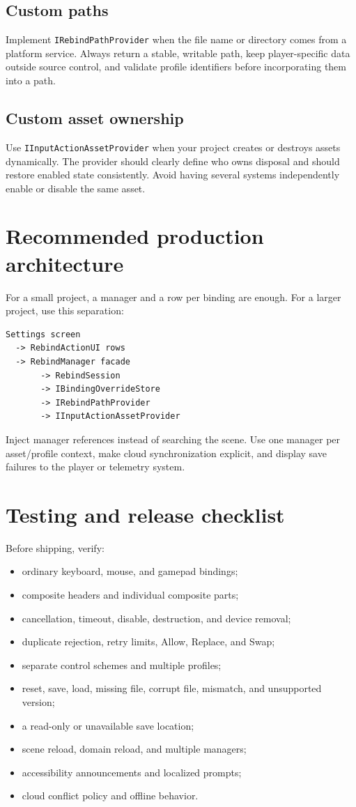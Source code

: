 \documentclass[11pt,a4paper]{article}
\newcommand{\class}[1]{\texttt{#1}}
\begin{document}
\subsection{Custom paths}
Implement \class{IRebindPathProvider} when the file name or directory comes from a platform service. Always return a stable, writable path, keep player-specific data outside source control, and validate profile identifiers before incorporating them into a path.

\subsection{Custom asset ownership}
Use \class{IInputActionAssetProvider} when your project creates or destroys assets dynamically. The provider should clearly define who owns disposal and should restore enabled state consistently. Avoid having several systems independently enable or disable the same asset.

\section{Recommended production architecture}
For a small project, a manager and a row per binding are enough. For a larger project, use this separation:
\begin{verbatim}
Settings screen
  -> RebindActionUI rows
  -> RebindManager facade
       -> RebindSession
       -> IBindingOverrideStore
       -> IRebindPathProvider
       -> IInputActionAssetProvider
\end{verbatim}
Inject manager references instead of searching the scene. Use one manager per asset/profile context, make cloud synchronization explicit, and display save failures to the player or telemetry system.

\section{Testing and release checklist}
Before shipping, verify:
\begin{itemize}
  \item ordinary keyboard, mouse, and gamepad bindings;
  \item composite headers and individual composite parts;
  \item cancellation, timeout, disable, destruction, and device removal;
  \item duplicate rejection, retry limits, Allow, Replace, and Swap;
  \item separate control schemes and multiple profiles;
  \item reset, save, load, missing file, corrupt file, mismatch, and unsupported version;
  \item a read-only or unavailable save location;
  \item scene reload, domain reload, and multiple managers;
  \item accessibility announcements and localized prompts;
  \item cloud conflict policy and offline behavior.
\end{itemize}
\end{document}
